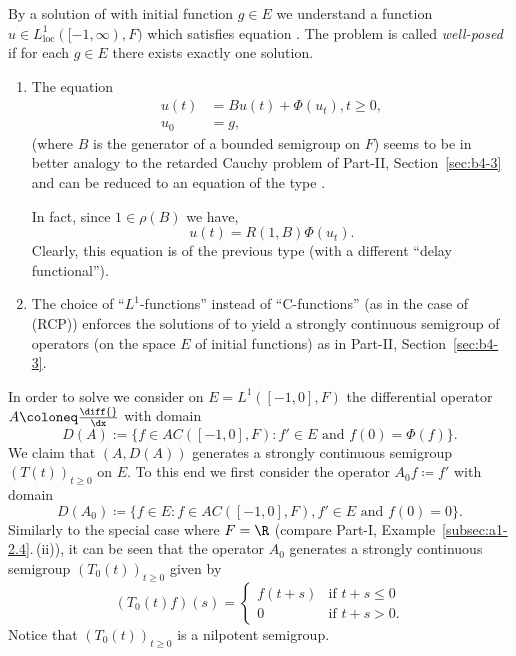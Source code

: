 By a solution of  with initial function $g \in E$ we understand a function $u \in L^{1}_{\mathrm{loc}}([-1,\infty),F)$ which satisfies equation .
The problem  is called \emph{well-posed} if for each $g \in E$ there exists exactly one solution.
\begin{remarks*}
\begin{enumerate}[\upshape (i), wide, labelindent=.25em] 
\item \label{rem:c4-kgk-1}
The equation
\begin{align*}
u(t) &= Bu(t) + \Phi(u_t), t \geq 0,\\
u_0 &= g,
\end{align*}
(where $B$ is the generator of a bounded semigroup on $F$) seems to be in better analogy to the retarded Cauchy problem of Part-II, Section~\ref{sec:b4-3} and can be reduced to an equation of the type .

In fact, since $1 \in \rho(B)$ we have,
\begin{equation*}\label{eq:c4-3.0-KGK1}
u(t) = R(1,B)\Phi(u_{t}).
\end{equation*}
Clearly, this equation is of the previous type (with a different \enquote{delay functional}).
\item \label{rem:c4-kgk-2}
The choice of \enquote{$L^{1}$-functions} instead of \enquote{C-functions} (as in the case of (RCP)) enforces the solutions of  to yield a strongly continuous semigroup of operators (on the space $E$ of initial functions) as in Part-II, Section~\ref{sec:b4-3}.
\end{enumerate}
\end{remarks*}
In order to solve  we consider on $E = L^{1}([-1,0],F)$ the differential operator $A \coloneq  \frac{\diff{}}{\dx}$ with domain
\begin{equation*}\label{eq:c4-3.0-KGK2}
D(A):=\{f \in AC([-1,0],F) \colon f' \in E \text{ and } f(0) = \Phi(f)\}.
\end{equation*}
We claim that $(A,D(A))$ generates a strongly continuous semigroup $(T(t))_{t\geq 0}$ on $E$.
To this end we first consider the operator $A_0 f \coloneq f'$ with domain
\begin{equation*}\label{eq:c4-3.0-KGK3}
D(A_0) \coloneq \{f \in E \colon f \in AC([-1,0],F), f' \in E \text{ and } f(0) = 0\}.
\end{equation*}
Similarly to the special case where $F = \R$ (compare Part-I, Example~\ref{subsec:a1-2.4}.\,(ii)), it can be seen that the operator $A_0$ generates a strongly continuous semigroup $(T_0(t))_{t\geq 0}$ given by
\begin{equation}\label{eq:c4-3.1}
(T_0(t)f)(s) = \begin{cases}
    f(t+s) & \text{if } t+s \leq 0 \\
    0 & \text{if } t+s > 0.
\end{cases}
\end{equation}
Notice that $(T_0(t))_{t \geq 0}$ is a nilpotent semigroup.


